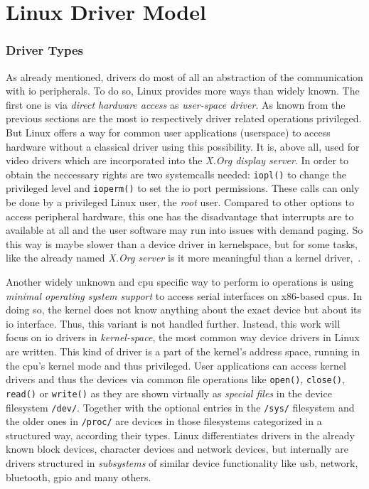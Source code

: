   
\section{Linux Driver Model}
\subsubsection*{Driver Types}
As already mentioned, drivers do most of all an abstraction of the communication with \ac{io} peripherals.
To do so, Linux provides more ways than widely known.
The first one is via \textit{direct hardware access} as \textit{user-space driver}.
As known from the previous sections are the most \ac{io} respectively driver related operations privileged.
But Linux offers a way for common user applications (userspace) to access hardware without a classical driver using this possibility.
It is, above all, used for video drivers which are incorporated into the \textit{X.Org display server}.
In order to obtain the neccessary rights are two systemcalls needed: \texttt{iopl()} to change the privileged level and \texttt{ioperm()} to set the \ac{io} port permissions.
These calls can only be done by a privileged Linux user, the \textit{root} user.
Compared to other options to access peripheral hardware, this one has the disadvantage that interrupts are to available at all and the user software may run into issues with demand paging.
So this way is maybe slower than a device driver in kernelspace, but for some tasks, like the already named \textit{X.Org server} is it more meaningful than a kernel driver\cite{lfd430},~\cite{glatz2015betriebssysteme}.

Another widely unknown and \ac{cpu} specific way to perform \ac{io} operations is using \textit{minimal operating system support} to access serial interfaces on x86-based \acp{cpu}.
In doing so, the kernel does not know anything about the exact device but about its \ac{io} interface\cite{glatz2015betriebssysteme}.
Thus, this variant is not handled further.
Instead, this work will focus on \ac{io} drivers in \textit{kernel-space}, the most common way device drivers in Linux are written.
This kind of driver is a part of the kernel's address space, running in the \ac{cpu}'s kernel mode and thus privileged.
User applications can access kernel drivers and thus the devices via common file operations like \texttt{open()}, \texttt{close()}, \texttt{read()} or \texttt{write()} as they are shown virtually as \textit{special files} in the device filesystem \texttt{/dev/}.
Together with the optional entries in the \texttt{/sys/} filesystem and the older ones in \texttt{/proc/} are devices in those filesystems categorized in a structured way, according their types\cite{glatz2015betriebssysteme}.
Linux differentiates drivers in the already known block devices, character devices and network devices, but internally are drivers structured in \textit{subsystems} of similar device functionality like usb, network, bluetooth, gpio and many others\cite{quade2016Linux}. 

